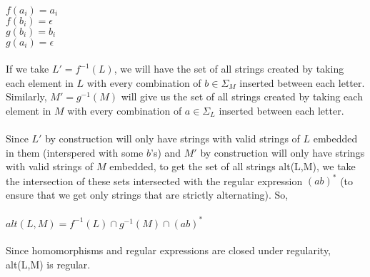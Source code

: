 \documentclass[12pt]{article}
\begin{document}
\begin{itemize}
\\
$f(a_i) = a_i$ \\
$f(b_i) = \epsilon$ \\
$g(b_i) = b_i$ \\
$g(a_i) = \epsilon$ \\
\\
If we take $L' = f^{-1}(L)$, we will have the set of all strings created by taking each element in $L$ with every combination of $b \in \Sigma_M$ inserted between each letter. Similarly, $M' = g^{-1}(M)$ will give us the set of all strings created by taking each element in $M$ with every combination of $a \in \Sigma_L$ inserted between each letter. \\
\\
Since $L'$ by construction will only have strings with valid strings of $L$ embedded in them (interspered with some $b$'s) and $M'$ by construction will only have strings with valid strings of $M$ embedded, to get the set of all strings alt(L,M), we take the intersection of these sets intersected with the regular expression $(ab)^*$ (to ensure that we get only strings that are strictly alternating). So, \\
\\
$alt(L,M) = f^{-1}(L) \cap g^{-1}(M) \cap (ab)^*$ \\
\\
Since homomorphisms and regular expressions are closed under regularity, alt(L,M) is regular. \\
\\


\end{itemize}
\end{document}
